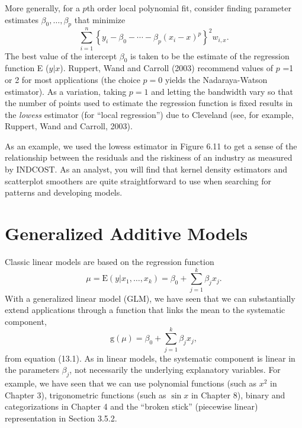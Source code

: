 More generally, for a $p$th order local polynomial fit, consider
finding parameter estimates $\beta_0, \ldots, \beta_p$ that minimize
\begin{equation}\label{E15:pthpolynomialfits}
\sum_{i=1}^n \left\{ y_i - \beta_0 - \cdots - \beta_p (x_i - x)^p
\right\}^2 w_{i,x} .
\end{equation} The best value of the intercept $\beta_0$ is taken
to be the estimate of the regression function E ($y |x$). Ruppert,
Wand and Carroll (2003) recommend values of $p$ =1 or 2 for most
applications (the choice $p=0$ yields the Nadaraya-Watson
estimator). As a variation, taking $p=1$ and letting the bandwidth
vary so that the number of points used to estimate the regression
function is fixed results in the \emph{lowess} estimator (for
``local regression'') due to Cleveland (see, for example, Ruppert,
Wand and Carroll, 2003).

As an example, we used the lowess estimator in Figure 6.11 to get a
sense of the relationship between the residuals and the riskiness of
an industry as measured by INDCOST. As an analyst, you will find
that kernel density estimators and scatterplot smoothers are quite
straightforward to use when searching for patterns and developing
models.

\section{Generalized Additive Models}\label{S15:GAM}

Classic linear models are based on the regression function
\begin{equation*}
\mu = \mathrm{E} (y| x_1, \ldots, x_k) = \beta_0 + \sum _{j=1}^k
\beta_j x_j .
\end{equation*}
With a generalized linear model (GLM), we have seen that we can
substantially extend applications through a function that links the
mean to the systematic component,
\begin{equation*}
\mathrm{g} \left(\mu  \right) = \beta_0 + \sum _{j=1}^k \beta_j x_j
,
\end{equation*}
from equation (13.1). As in linear models, the systematic component
is linear in the parameters $\beta_j$, not necessarily the
underlying explanatory variables. For example, we have seen that we
can use polynomial functions (such as $x^2$ in Chapter 3),
trigonometric functions (such as $\sin x$ in Chapter 8), binary and
categorizations in Chapter 4 and the ``broken stick'' (piecewise
linear) representation in Section 3.5.2.


